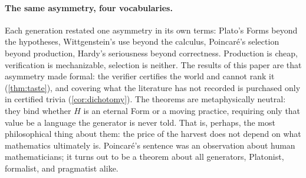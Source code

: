 \documentclass[11pt]{article}
\numberwithin{equation}{section}
\newcommand{\Val}{H}
\theoremstyle{plain}
\theoremstyle{definition}
\theoremstyle{remark}
\begin{document}
\paragraph{The same asymmetry, four vocabularies.}
Each generation restated one asymmetry in its own terms: Plato's Forms beyond the
hypotheses, Wittgenstein's use beyond the calculus, Poincar\'e's selection beyond
production, Hardy's seriousness beyond correctness. Production is cheap, verification is
mechanizable, selection is neither. The results of this paper are that asymmetry made
formal: the verifier certifies the world and cannot rank it (\cref{thm:taste}), and
covering what the literature has not recorded is purchased only in certified trivia
(\cref{cor:dichotomy}). The theorems are metaphysically neutral: they bind whether
$\Val$ is an eternal Form or a moving practice, requiring only that value be a language the
generator is never told. That is, perhaps, the most philosophical thing about them: the
price of the harvest does not depend on what mathematics ultimately is. Poincar\'e's
sentence was an observation about human mathematicians; it turns out to be a theorem about
all generators, Platonist, formalist, and pragmatist alike.
\end{document}
